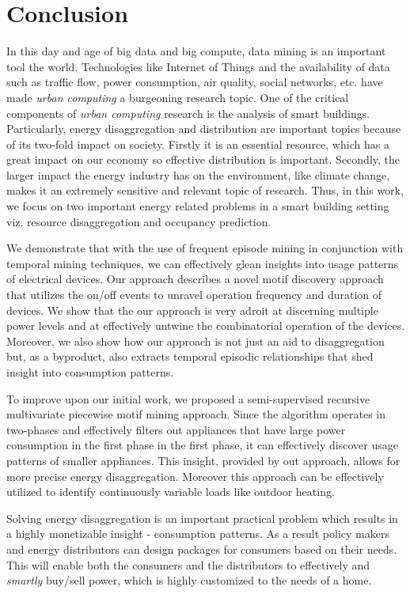 \chapter{Conclusion}

In this day and age of big data and big compute, data mining is an important tool  the world. Technologies like Internet of Things and the availability of data such as traffic flow, power consumption, air quality, social networks, etc. have made \emph{urban computing} a burgeoning research topic. One of the critical components of \emph{urban computing} research is the analysis of smart buildings. Particularly, energy disaggregation and distribution are important topics because of its two-fold impact on society. Firstly it is an essential resource, which has a great impact on our economy so effective distribution is important. Secondly, the larger impact the energy industry has on the environment, like climate change, makes it an extremely sensitive and relevant topic of research. Thus, in this work, we focus on two important energy related problems in a smart building setting viz. resource disaggregation and occupancy prediction. 

We demonstrate that with the use of frequent episode mining in conjunction with temporal mining techniques, we can effectively glean insights into usage patterns of electrical devices. Our approach describes a novel motif discovery approach that utilizes the on/off events to unravel operation frequency and duration of devices. We show that the our approach is very adroit at discerning multiple power levels and at effectively untwine the combinatorial operation of the devices. Moreover, we also show how our approach is not just an aid to disaggregation but, as a byproduct, also extracts temporal episodic relationships that shed insight into consumption patterns.

To improve upon our initial work, we proposed a semi-supervised recursive multivariate piecewise motif mining approach. Since the algorithm operates in two-phases and effectively filters out appliances that have large power consumption in the first phase in the first phase, it can effectively discover usage patterns of smaller appliances. This insight, provided by out approach, allows for more precise energy disaggregation. Moreover this approach can be effectively utilized to identify continuously variable loads like outdoor heating. 

Solving energy disaggregation is an important practical problem which results in a highly monetizable insight - consumption patterns. As a result policy makers and energy distributors can design packages for consumers based on their needs. This will enable both the consumers and the distributors to effectively and \emph{smartly} buy/sell power, which is highly customized to the needs of a home.

